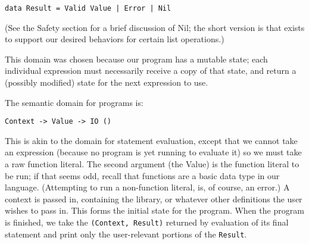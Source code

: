 \documentclass{article}
\begin{document}
\begin{lstlisting}
data Result = Valid Value | Error | Nil
\end{lstlisting}

(See the Safety section for a brief discussion of Nil; the short version is that exists to support our desired behaviors for certain list operations.)

This domain was chosen because our program has a mutable state; each individual expression must necessarily receive a copy of that state, and return a (possibly modified) state for the next expression to use.

The semantic domain for programs is:

\begin{lstlisting}
Context -> Value -> IO ()
\end{lstlisting}

This is akin to the domain for statement evaluation, except that we cannot take an expression (because no program is yet running to evaluate it) so we must take a raw function literal. The second argument (the Value) is the function literal to be run; if that seems odd, recall that functions are a basic data type in our language. (Attempting to run a non-function literal, is, of course, an error.)  A context is passed in, containing the library, or whatever other definitions the user wishes to pass in.  This forms the initial state for the program. When the program is finished, we take the \texttt{(Context, Result)} returned by evaluation of its final statement and print only the user-relevant portions of the \texttt{Result}.
\end{document}
